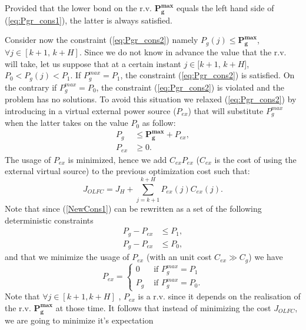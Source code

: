 \documentclass[conference]{IEEEtran}
\begin{document}
Provided that the lower bond on the r.v. $\bm{P_g^{max}}$ equals the left hand side of (\ref{eq:Pgr_cons1}), the latter  is always satisfied. 

Consider now the constraint (\ref{eq:Pgr_cons2}) namely $P_g(j)\leq \bm{P_g^{max}}$, $\forall j \in [k+1,\, k+H]$. Since we do not know in advance the value that the r.v. will take,  let us suppose that at a certain instant $ j \in [k+1, \, k+H$], $P_0 < P_g(j) < P_1$. If $P_g^{max} = P_1$, the constraint (\ref{eq:Pgr_cons2}) is satisfied. On the contrary if $P_g^{max} = P_0$, the constraint (\ref{eq:Pgr_cons2}) is violated and the problem has no solutions. To avoid this situation we relaxed (\ref{eq:Pgr_cons2}) by introducing in a virtual external power source ($P_{ex}$) that will substitute $P_g^{max}$ when the latter takes on the value $P_0$ as follow: 
\begin{align}
     P_{g} & \leq \bm{P_g^{max}} + P_{ex}, \label{NewCons1}\\
     P_{ex} & \geq \label{NewCons2}0.
\end{align}
The usage of $P_{ex}$ is minimized, hence we add $C_{ex}P_{ex}$ ($C_{ex}$ is the cost of using the external virtual source) to the previous optimization cost such that: 
\begin{equation}
    J_{OLFC} = J_H + \sum_{j=k+1}^{k+H} P_{ex}(j)C_{ex}(j).
\end{equation}
Note that since (\ref{NewCons1}) can be rewritten as a set of the following deterministic constraints 
 \begin{align}
 P_g - P_{ex} &\leq P_1 ,\label{NewCons3}\\ 
 P_g - P_{ex} & \leq P_0,\label{NewCons4}
 \end{align}
 and that we minimize the usage of $P_{ex}$ (with an unit cost $C_{ex} \gg C_g$) we have 
 \begin{equation}
    P_{ex} = \left \{
        \begin{aligned}
            0 & \text{ if }  P_g^{max} = P_1 \\
            P_g &\text{ if } P_g^{max} = P_0.
        \end{aligned}\right.
\end{equation}
 Note that $\forall j \in [k+1, k+H] $ , $P_{ex}$ is a r.v. since it depends on the realisation of the r.v. $\bm{P_{g}^{max}}$ at those time. It follows that instead of minimizing the cost $J_{OLFC}$, we are going to minimize it's expectation
\end{document}
